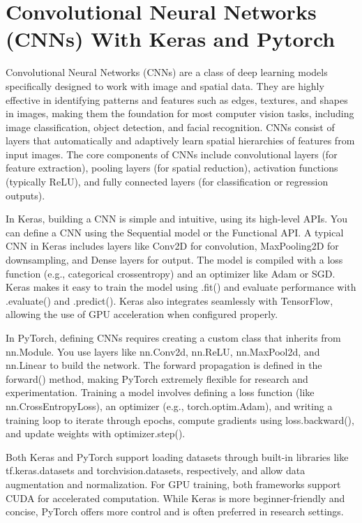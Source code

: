 \documentclass[10pt]{article}
\begin{document}
\section*{Convolutional Neural Networks (CNNs) With Keras and Pytorch}
Convolutional Neural Networks (CNNs) are a class of deep learning models specifically designed to work with image and spatial data. They are highly effective in identifying patterns and features such as edges, textures, and shapes in images, making them the foundation for most computer vision tasks, including image classification, object detection, and facial recognition. CNNs consist of layers that automatically and adaptively learn spatial hierarchies of features from input images. The core components of CNNs include convolutional layers (for feature extraction), pooling layers (for spatial reduction), activation functions (typically ReLU), and fully connected layers (for classification or regression outputs).

In Keras, building a CNN is simple and intuitive, using its high-level APIs. You can define a CNN using the Sequential model or the Functional API. A typical CNN in Keras includes layers like Conv2D for convolution, MaxPooling2D for downsampling, and Dense layers for output. The model is compiled with a loss function (e.g., categorical crossentropy) and an optimizer like Adam or SGD. Keras makes it easy to train the model using .fit() and evaluate performance with .evaluate() and .predict(). Keras also integrates seamlessly with TensorFlow, allowing the use of GPU acceleration when configured properly.

In PyTorch, defining CNNs requires creating a custom class that inherits from nn.Module. You use layers like nn.Conv2d, nn.ReLU, nn.MaxPool2d, and nn.Linear to build the network. The forward propagation is defined in the forward() method, making PyTorch extremely flexible for research and experimentation. Training a model involves defining a loss function (like nn.CrossEntropyLoss), an optimizer (e.g., torch.optim.Adam), and writing a training loop to iterate through epochs, compute gradients using loss.backward(), and update weights with optimizer.step().

Both Keras and PyTorch support loading datasets through built-in libraries like tf.keras.datasets and torchvision.datasets, respectively, and allow data augmentation and normalization. For GPU training, both frameworks support CUDA for accelerated computation. While Keras is more beginner-friendly and concise, PyTorch offers more control and is often preferred in research settings.
\end{document}

